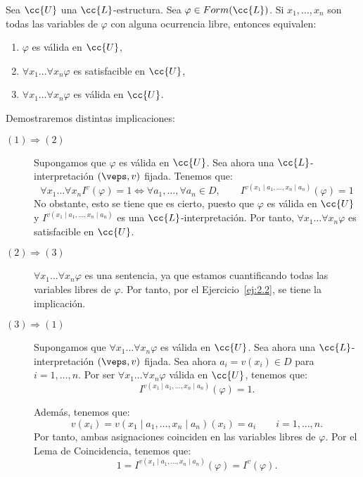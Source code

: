 \begin{ejercicio}\label{ej:2.4}
    Sea $\cc{U}$ una $\cc{L}$-estructura. Sea $\varphi \in Form(\cc{L})$. Si $x_1, \ldots, x_n$ son todas las variables de $\varphi$ con alguna ocurrencia libre, entonces equivalen:
    \begin{enumerate}
        \item $\varphi$ es válida en $\cc{U}$,
        \item $\forall x_1 \ldots \forall x_n \varphi$ es satisfacible en $\cc{U}$,
        \item $\forall x_1 \ldots \forall x_n \varphi$ es válida en $\cc{U}$.
    \end{enumerate}

    Demostraremos distintas implicaciones:
    \begin{description}
        \item[$(1)\Longrightarrow(2)$] Supongamos que $\varphi$ es válida en $\cc{U}$. Sea ahora una $\cc{L}$-interpretación $(\veps,v)$ fijada. Tenemos que:
        \begin{equation*}
            \forall x_1 \ldots \forall x_n I^v(\varphi) = 1\iff \forall a_1,\ldots,\forall a_n\in D,\qquad I^{v(x_1\mid a_1,\ldots,x_n\mid a_n)}(\varphi) = 1
        \end{equation*}
        No obstante, esto se tiene que es cierto, puesto que $\varphi$ es válida en $\cc{U}$ y $I^{v(x_1\mid a_1,\ldots,x_n\mid a_n)}$ es una $\cc{L}$-interpretación. Por tanto, $\forall x_1 \ldots \forall x_n \varphi$ es satisfacible en $\cc{U}$.

        \item[$(2)\Longrightarrow(3)$] $\forall x_1 \ldots \forall x_n \varphi$ es una sentencia, ya que estamos cuantificando todas las variables libres de $\varphi$. Por tanto, por el Ejercicio~\ref{ej:2.2}, se tiene la implicación.
        
        \item[$(3)\Longrightarrow(1)$] Supongamos que $\forall x_1 \ldots \forall x_n \varphi$ es válida en $\cc{U}$. Sea ahora una $\cc{L}$-interpretación $(\veps,v)$ fijada. Sea ahora $a_i=v(x_i)\in D$ para $i=1,\ldots,n$. Por ser $\forall x_1 \ldots \forall x_n \varphi$ válida en $\cc{U}$, tenemos que:
        \begin{equation*}
            I^{v(x_1\mid a_1,\ldots,x_n\mid a_n)}(\varphi) = 1.
        \end{equation*}

        Además, tenemos que:
        \begin{equation*}
            v(x_i) = v(x_1\mid a_1,\ldots,x_n\mid a_n)(x_i) = a_i\qquad i=1,\ldots,n.
        \end{equation*}
        Por tanto, ambas asignaciones coinciden en las variables libres de $\varphi$. Por el Lema de Coincidencia, tenemos que:
        \begin{equation*}
            1 = I^{v(x_1\mid a_1,\ldots,x_n\mid a_n)}(\varphi) = I^v(\varphi).
        \end{equation*}


\end{description}
\end{ejercicio}
